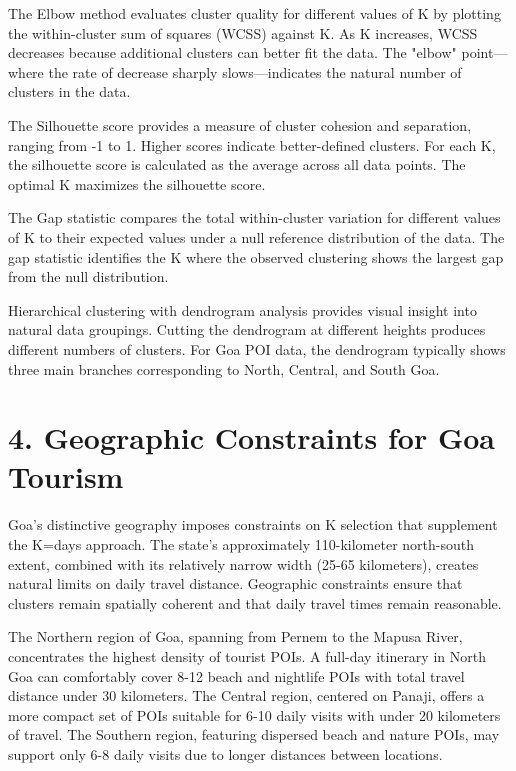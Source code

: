The Elbow method evaluates cluster quality for different values of K by plotting the within-cluster sum of squares (WCSS) against K. As K increases, WCSS decreases because additional clusters can better fit the data. The "elbow" point—where the rate of decrease sharply slows—indicates the natural number of clusters in the data.

The Silhouette score provides a measure of cluster cohesion and separation, ranging from -1 to 1. Higher scores indicate better-defined clusters. For each K, the silhouette score is calculated as the average across all data points. The optimal K maximizes the silhouette score.

The Gap statistic compares the total within-cluster variation for different values of K to their expected values under a null reference distribution of the data. The gap statistic identifies the K where the observed clustering shows the largest gap from the null distribution.

Hierarchical clustering with dendrogram analysis provides visual insight into natural data groupings. Cutting the dendrogram at different heights produces different numbers of clusters. For Goa POI data, the dendrogram typically shows three main branches corresponding to North, Central, and South Goa.

\section{4. Geographic Constraints for Goa Tourism}

Goa's distinctive geography imposes constraints on K selection that supplement the K=days approach. The state's approximately 110-kilometer north-south extent, combined with its relatively narrow width (25-65 kilometers), creates natural limits on daily travel distance. Geographic constraints ensure that clusters remain spatially coherent and that daily travel times remain reasonable.

The Northern region of Goa, spanning from Pernem to the Mapusa River, concentrates the highest density of tourist POIs. A full-day itinerary in North Goa can comfortably cover 8-12 beach and nightlife POIs with total travel distance under 30 kilometers. The Central region, centered on Panaji, offers a more compact set of POIs suitable for 6-10 daily visits with under 20 kilometers of travel. The Southern region, featuring dispersed beach and nature POIs, may support only 6-8 daily visits due to longer distances between locations.

